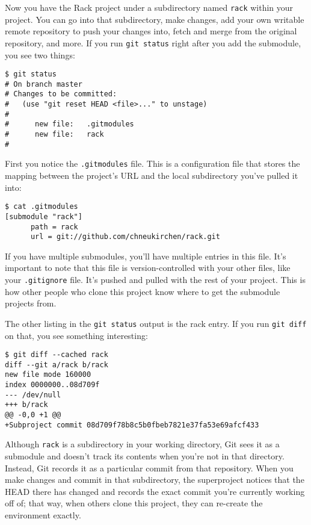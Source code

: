 \documentclass[a4paper]{book}
\newcounter{tab}[chapter]
\begin{document}
Now you have the Rack project under a subdirectory named \texttt{rack} within your project. You can go into that subdirectory, make changes, add your own writable remote repository to push your changes into, fetch and merge from the original repository, and more. If you run \texttt{git status} right after you add the submodule, you see two things:

\begin{shaded}\begin{verbatim}
$ git status
# On branch master
# Changes to be committed:
#   (use "git reset HEAD <file>..." to unstage)
#
#      new file:   .gitmodules
#      new file:   rack
#
\end{verbatim}\end{shaded}

First you notice the \texttt{.gitmodules} file. This is a configuration file that stores the mapping between the project's URL and the local subdirectory you've pulled it into:

\begin{shaded}\begin{verbatim}
$ cat .gitmodules
[submodule "rack"]
      path = rack
      url = git://github.com/chneukirchen/rack.git
\end{verbatim}\end{shaded}

If you have multiple submodules, you'll have multiple entries in this file. It's important to note that this file is version-controlled with your other files, like your \texttt{.gitignore} file. It's pushed and pulled with the rest of your project. This is how other people who clone this project know where to get the submodule projects from.

The other listing in the \texttt{git status} output is the rack entry. If you run \texttt{git diff} on that, you see something interesting:

\begin{shaded}\begin{verbatim}
$ git diff --cached rack
diff --git a/rack b/rack
new file mode 160000
index 0000000..08d709f
--- /dev/null
+++ b/rack
@@ -0,0 +1 @@
+Subproject commit 08d709f78b8c5b0fbeb7821e37fa53e69afcf433
\end{verbatim}\end{shaded}

Although \texttt{rack} is a subdirectory in your working directory, Git sees it as a submodule and doesn't track its contents when you're not in that directory. Instead, Git records it as a particular commit from that repository. When you make changes and commit in that subdirectory, the superproject notices that the HEAD there has changed and records the exact commit you're currently working off of; that way, when others clone this project, they can re-create the environment exactly.
\end{document}
